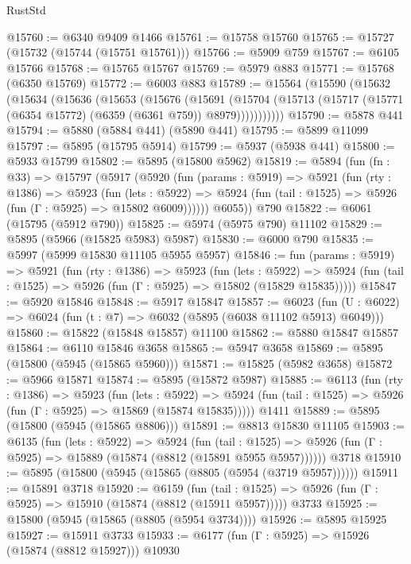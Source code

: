\begin{lexlean}{RustStd}
\begin{coremodule}
{{@15760 := @6340 @9409 @1466
@15761 := @15758 @15760
@15765 := @15727 (@15732 (@15744 (@15751 @15761)))
@15766 := @5909 @759
@15767 := @6105 @15766
@15768 := @15765 @15767
@15769 := @5979 @883
@15771 := @15768 (@6350 @15769)
@15772 := @6003 @883
@15789 := @15564
    (@15590
      (@15632
        (@15634
          (@15636
            (@15653
              (@15676
                (@15691
                  (@15704
                    (@15713 (@15717 (@15771 (@6354 @15772) (@6359 (@6361 @759)) @8979)))))))))))
@15790 := @5878 @441
@15794 := @5880 (@5884 @441) (@5890 @441)
@15795 := @5899 @11099
@15797 := @5895 (@15795 @5914)
@15799 := @5937 (@5938 @441)
@15800 := @5933 @15799
@15802 := @5895 (@15800 @5962)
@15819 := @5894
    (fun (fn : @33) =>
    @15797
      (@5917
        (@5920
          (fun (params : @5919) =>
          @5921
            (fun (rty : @1386) =>
            @5923
              (fun (lets : @5922) =>
              @5924 (fun (tail : @1525) => @5926 (fun (Γ : @5925) => @15802 @6009))))))
        @6055))
    @790
@15822 := @6061 (@15795 (@5912 @790))
@15825 := @5974 (@5975 @790) @11102
@15829 := @5895 (@5966 (@15825 @5983) @5987)
@15830 := @6000 @790
@15835 := @5997 (@5999 @15830 @11105 @5955 @5957)
@15846 := fun (params : @5919) =>
  @5921
    (fun (rty : @1386) =>
    @5923
      (fun (lets : @5922) =>
      @5924 (fun (tail : @1525) => @5926 (fun (Γ : @5925) => @15802 (@15829 @15835)))))
@15847 := @5920 @15846
@15848 := @5917 @15847
@15857 := @6023
    (fun (U : @6022) => @6024 (fun (t : @7) => @6032 (@5895 (@6038 @11102 @5913) @6049)))
@15860 := @15822 (@15848 @15857) @11100
@15862 := @5880 @15847 @15857
@15864 := @6110 @15846 @3658
@15865 := @5947 @3658
@15869 := @5895 (@15800 (@5945 (@15865 @5960)))
@15871 := @15825 (@5982 @3658)
@15872 := @5966 @15871
@15874 := @5895 (@15872 @5987)
@15885 := @6113
    (fun (rty : @1386) =>
    @5923
      (fun (lets : @5922) =>
      @5924 (fun (tail : @1525) => @5926 (fun (Γ : @5925) => @15869 (@15874 @15835)))))
    @1411
@15889 := @5895 (@15800 (@5945 (@15865 @8806)))
@15891 := @8813 @15830 @11105
@15903 := @6135
    (fun (lets : @5922) =>
    @5924
      (fun (tail : @1525) =>
      @5926 (fun (Γ : @5925) => @15889 (@15874 (@8812 (@15891 @5955 @5957))))))
    @3718
@15910 := @5895 (@15800 (@5945 (@15865 (@8805 (@5954 (@3719 @5957))))))
@15911 := @15891 @3718
@15920 := @6159
    (fun (tail : @1525) => @5926 (fun (Γ : @5925) => @15910 (@15874 (@8812 (@15911 @5957)))))
    @3733
@15925 := @15800 (@5945 (@15865 (@8805 (@5954 @3734))))
@15926 := @5895 @15925
@15927 := @15911 @3733
@15933 := @6177 (fun (Γ : @5925) => @15926 (@15874 (@8812 @15927))) @10930
}}
\end{coremodule}
\end{lexlean}
